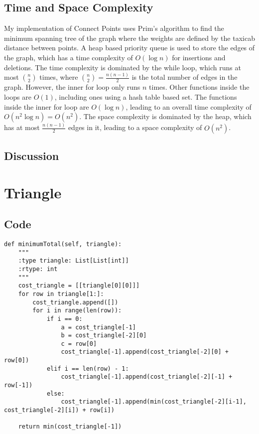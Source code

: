 \documentclass[12pt]{article}
\begin{document}
\subsection{Time and Space Complexity}
My implementation of Connect Points uses Prim's algorithm to find the minimum spanning tree
of the graph where the weights are defined by the taxicab distance between points. A heap
based priority queue is used to store the edges of the graph, which has a time complexity of
\( O(\log n) \) for insertions and deletions. The time complexity is dominated by the while loop,
which runs at most \( \binom{n}{2} \) times, where \( \binom{n}{2} = \frac{n(n-1)}{2} \) is the 
total number of edges in the graph. However, the inner for loop only runs \( n \) times. Other
functions inside the loops are \( O(1) \), including ones using a hash table based set. The 
functions inside the inner for loop are \( O(\log n) \), leading to an overall time complexity of
\( O(n^2 \log n) = O(n^2)\). The space complexity is dominated by the heap, which has at most
\( \frac{n(n-1)}{2} \) edges in it, leading to a space complexity of \( O(n^2) \).

\subsection{Discussion}

\newpage
\section{Triangle}
\subsection{Code}
\lstset{
    caption=Triangle,
}
\begin{lstlisting}
def minimumTotal(self, triangle):
    """
    :type triangle: List[List[int]]
    :rtype: int
    """
    cost_triangle = [[triangle[0][0]]]
    for row in triangle[1:]:
        cost_triangle.append([])
        for i in range(len(row)):
            if i == 0:
                a = cost_triangle[-1]
                b = cost_triangle[-2][0]
                c = row[0]
                cost_triangle[-1].append(cost_triangle[-2][0] + row[0])
            elif i == len(row) - 1:
                cost_triangle[-1].append(cost_triangle[-2][-1] + row[-1])
            else:
                cost_triangle[-1].append(min(cost_triangle[-2][i-1], cost_triangle[-2][i]) + row[i])

    return min(cost_triangle[-1])
\end{lstlisting}
\end{document}
